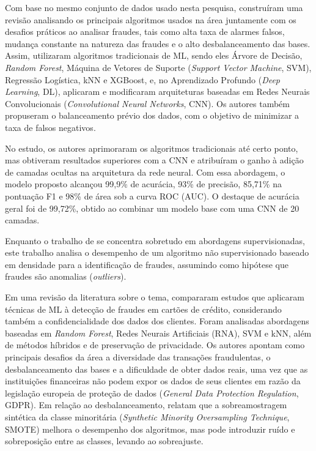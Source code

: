 \documentclass{uflamon}          %
\begin{document}
Com base no mesmo conjunto de dados usado nesta pesquisa,  construíram uma revisão analisando os principais algoritmos usados na área juntamente com os desafios práticos ao analisar fraudes, tais como alta taxa de alarmes falsos, mudança constante na natureza das fraudes e o alto desbalanceamento das bases. Assim, utilizaram algoritmos tradicionais de ML, sendo eles Árvore de Decisão, \textit{Random Forest}, Máquina de Vetores de Suporte (\textit{Support Vector Machine}, SVM), Regressão Logística, kNN e XGBoost, e, no Aprendizado Profundo (\textit{Deep Learning}, DL), aplicaram e modificaram arquiteturas baseadas em Redes Neurais Convolucionais (\textit{Convolutional Neural Networks}, CNN). Os autores também propuseram o balanceamento prévio dos dados, com o objetivo de minimizar a taxa de falsos negativos.

No estudo, os autores aprimoraram os algoritmos tradicionais até certo ponto, mas obtiveram resultados superiores com a CNN e atribuíram o ganho à adição de camadas ocultas na arquitetura da rede neural. Com essa abordagem, o modelo proposto alcançou 99,9\% de acurácia, 93\% de precisão, 85,71\% na pontuação F1 e 98\% de área sob a curva ROC (AUC). O destaque de acurácia geral foi de 99,72\%, obtido ao combinar um modelo base com uma CNN de 20 camadas.

Enquanto o trabalho de  se concentra sobretudo em abordagens supervisionadas, este trabalho analisa o desempenho de um algoritmo não supervisionado baseado em densidade para a identificação de fraudes, assumindo como hipótese que fraudes são anomalias (\textit{outliers}).

Em uma revisão da literatura sobre o tema,  compararam estudos que aplicaram técnicas de ML à detecção de fraudes em cartões de crédito, considerando também a confidencialidade dos dados dos clientes. Foram analisadas abordagens baseadas em \textit{Random Forest}, Redes Neurais Artificiais (RNA), SVM e kNN, além de métodos híbridos e de preservação de privacidade. Os autores apontam como principais desafios da área a diversidade das transações fraudulentas, o desbalanceamento das bases e a dificuldade de obter dados reais, uma vez que as instituições financeiras não podem expor os dados de seus clientes em razão da legislação europeia de proteção de dados (\textit{General Data Protection Regulation}, GDPR). Em relação ao desbalanceamento, relatam que a sobreamostragem sintética da classe minoritária (\textit{Synthetic Minority Oversampling Technique}, SMOTE) melhora o desempenho dos algoritmos, mas pode introduzir ruído e sobreposição entre as classes, levando ao sobreajuste.
\end{document}
